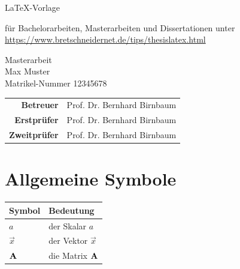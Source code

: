 
\pagestyle{empty} %

\begin{center}
\begin{Huge}
\LaTeX-Vorlage\\
\end{Huge}

\begin{Large}
für Bachelorarbeiten, Masterarbeiten und Dissertationen
unter \url{https://www.bretschneidernet.de/tips/thesislatex.html} \\
\end{Large}
\vspace{8mm}
Masterarbeit\\
\vspace{0.4cm}
\vspace{2 cm}
Max Muster \\
Matrikel-Nummer 12345678\\
\vspace{8cm}
\begin{tabular}{rl}
{\bfseries Betreuer} & Prof. Dr. Bernhard Birnbaum\\
{\bfseries Erstprüfer}&Prof. Dr. Bernhard Birnbaum\\
{\bfseries Zweitprüfer}&Prof. Dr. Bernhard Birnbaum\\
\end{tabular}

\end{center}
\clearpage

\pagestyle{scrheadings}
\chead{\rightmark}  %
\cfoot{\pagemark} %

\tableofcontents %
\listoffigures %
\listoftables %

\label{s.sym} %
\section*{Allgemeine Symbole}\label{s.sym.alg}
\begin{flushleft}\begin{tabularx}{\textwidth}{l|X}
Symbol & Bedeutung\\\hline
$a$ & der Skalar $a$ \\
$\vec{x}$ & der Vektor $\vec{x}$\\
${\textbf{A}}$ & die Matrix ${\textbf{A}}$\\
\end{tabularx}\end{flushleft}




